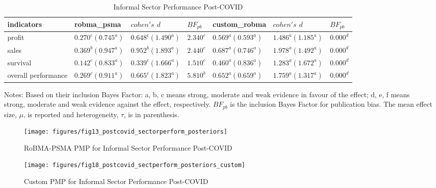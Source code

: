 \documentclass[a4paper, 12pt]{article}
\begin{document}
    \begin{table}[H]
        \centering
        \caption{Informal Sector Performance Post-COVID}
        \label{tab6:informal-sector-perform-postcovid}
        \begin{tabular}{lllllll}
            \toprule
            indicators          & robma\_psma         & $cohen's$ $d$       & $BF_{pb}$ & custom\_robma       & $cohen's$ $d$       & $BF_{pb}$ \\
            \midrule
            profit              & $0.270^c (0.745^a)$ & $0.648^c (1.490^a)$ & $2.340^c$ & $0.569^a (0.593^a)$ & $1.486^a (1.185^a)$ & $0.000^d$ \\
            sales               & $0.369^b (0.947^a)$ & $0.952^b (1.893^a)$ & $2.440^c$ & $0.687^a (0.746^a)$ & $1.978^a (1.492^a)$ & $0.000^d$ \\
            survival            & $0.142^c (0.833^a)$ & $0.339^c (1.666^a)$ & $1.510^c$ & $0.460^a (0.836^a)$ & $1.283^a (1.672^a)$ & $0.000^d$ \\
            overall performance & $0.269^c (0.911^a)$ & $0.665^c (1.823^a)$ & $5.810^b$ & $0.652^a (0.659^a)$ & $1.759^a (1.317^a)$ & $0.000^d$ \\
            \bottomrule
        \end{tabular}
        \begin{minipage}{19cm}
            \vspace{0.1cm}
            \small Notes: Based on their inclusion Bayes Factor: a, b, c means strong, moderate and weak evidence in favour of the effect; d, e, f means strong, moderate and weak evidence against the effect, respectively. $BF_{pb}$ is the inclusion Bayes Factor for publication bias. The mean effect size, $\mu$, is reported and heterogeneity, $\tau$, is in parenthesis.
        \end{minipage}
    \end{table}

    \begin{figure}[H]
        \centering
        \texttt{[image: figures/fig13\_postcovid\_sectorperform\_posteriors]}
        \caption{RoBMA-PSMA PMP for Informal Sector Performance Post-COVID}
        \label{fig10:robma-psma-pmp-postcovid-sectorperform-posteriors}
    \end{figure}

    \begin{figure}[H]
        \centering
        \texttt{[image: figures/fig18\_postcovid\_sectperform\_posteriors\_custom]}
        \caption{Custom PMP for Informal Sector Performance Post-COVID}
        \label{fig11:custom-pmp-postcovid-sectorperform-posteriors}
    \end{figure}
\end{document}
